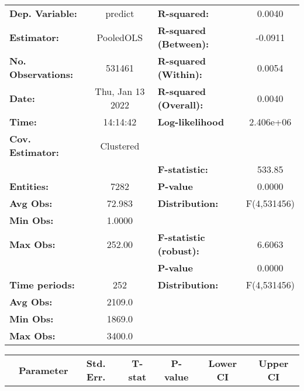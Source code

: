 \begin{center}
\begin{tabular}{lclc}
\toprule
\textbf{Dep. Variable:}    &      predict       & \textbf{  R-squared:         }   &      0.0040      \\
\textbf{Estimator:}        &     PooledOLS      & \textbf{  R-squared (Between):}  &     -0.0911      \\
\textbf{No. Observations:} &       531461       & \textbf{  R-squared (Within):}   &      0.0054      \\
\textbf{Date:}             &  Thu, Jan 13 2022  & \textbf{  R-squared (Overall):}  &      0.0040      \\
\textbf{Time:}             &      14:14:42      & \textbf{  Log-likelihood     }   &    2.406e+06     \\
\textbf{Cov. Estimator:}   &     Clustered      & \textbf{                     }   &                  \\
\textbf{}                  &                    & \textbf{  F-statistic:       }   &      533.85      \\
\textbf{Entities:}         &        7282        & \textbf{  P-value            }   &      0.0000      \\
\textbf{Avg Obs:}          &       72.983       & \textbf{  Distribution:      }   &   F(4,531456)    \\
\textbf{Min Obs:}          &       1.0000       & \textbf{                     }   &                  \\
\textbf{Max Obs:}          &       252.00       & \textbf{  F-statistic (robust):} &      6.6063      \\
\textbf{}                  &                    & \textbf{  P-value            }   &      0.0000      \\
\textbf{Time periods:}     &        252         & \textbf{  Distribution:      }   &   F(4,531456)    \\
\textbf{Avg Obs:}          &       2109.0       & \textbf{                     }   &                  \\
\textbf{Min Obs:}          &       1869.0       & \textbf{                     }   &                  \\
\textbf{Max Obs:}          &       3400.0       & \textbf{                     }   &                  \\
\bottomrule
\end{tabular}
\begin{tabular}{lcccccc}
                & \textbf{Parameter} & \textbf{Std. Err.} & \textbf{T-stat} & \textbf{P-value} & \textbf{Lower CI} & \textbf{Upper CI}  \\

\end{tabular}
\end{center}
